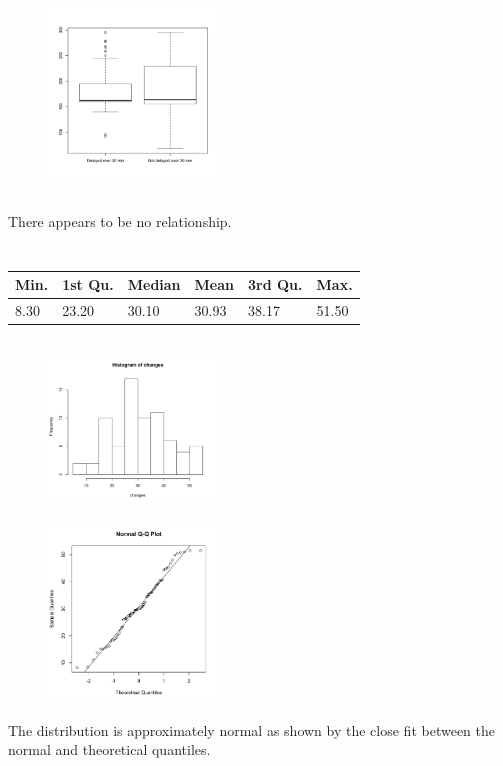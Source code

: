 \documentclass[twocolumn]{article}
\newcommand{\setsection}[1]{\setcounter{section}{#1}\section{}}
\begin{document}
\subsection{}
\begin{figure}[h]
\centering
\includegraphics[width=0.4\textwidth]{4c.pdf}
\end{figure}

\subsection{}
There appears to be no relationship.

\setsection{6}
\begin{table}[h]
\centering
\begin{tabular}{@{}llllll@{}}
\toprule
Min. & 1st Qu. & Median & Mean  & 3rd Qu. & Max.  \\ \midrule
8.30 & 23.20   & 30.10  & 30.93 & 38.17   & 51.50
\end{tabular}
\end{table}

\subsection{}
\begin{figure}[h]
\centering
\includegraphics[width=0.4\textwidth]{6b1.pdf}
\end{figure}
\newpage
\begin{figure}[h]
\centering
\includegraphics[width=0.4\textwidth]{6b2.pdf}
\end{figure}

The distribution is approximately normal as shown by the close fit between the normal and theoretical quantiles.
\end{document}
